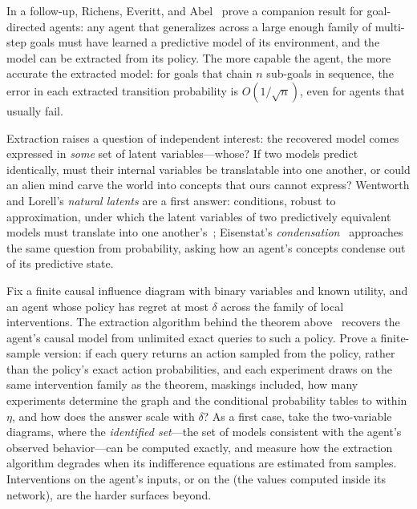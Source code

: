 In a follow-up, Richens, Everitt, and Abel~\cite{richens2025general} prove a companion result for goal-directed agents: any agent that generalizes across a large enough family of multi-step goals must have learned a predictive model of its environment, and the model can be extracted from its policy. The more capable the agent, the more accurate the extracted model: for goals that chain $n$ sub-goals in sequence, the error in each extracted transition probability is $O(1/\sqrt{n})$, even for agents that usually fail.

Extraction raises a question of independent interest: the recovered model comes expressed in \emph{some} set of latent variables---whose? If two models predict identically, must their internal variables be translatable into one another, or could an alien mind carve the world into concepts that ours cannot express? Wentworth and Lorell's \emph{natural latents} are a first answer: conditions, robust to approximation, under which the latent variables of two predictively equivalent models must translate into one another's~\cite{wentworth2025}; Eisenstat's \emph{condensation}~\cite{eisenstat2025} approaches the same question from probability, asking how an agent's concepts condense out of its predictive state.

\begin{openproblem}
Fix a finite causal influence diagram with binary variables and known utility, and an agent whose policy has regret at most $\delta$ across the family of local interventions. The extraction algorithm behind the theorem above~\cite{richens2024} recovers the agent's causal model from unlimited exact queries to such a policy. Prove a finite-sample version: if each query returns an action sampled from the policy, rather than the policy's exact action probabilities, and each experiment draws on the same intervention family as the theorem, maskings included, how many experiments determine the graph and the conditional probability tables to within $\eta$, and how does the answer scale with $\delta$? As a first case, take the two-variable diagrams, where the \emph{identified set}---the set of models consistent with the agent's observed behavior---can be computed exactly, and measure how the extraction algorithm degrades when its indifference equations are estimated from samples. Interventions on the agent's inputs, or on the  (the values computed inside its network), are the harder surfaces beyond.
\end{openproblem}

